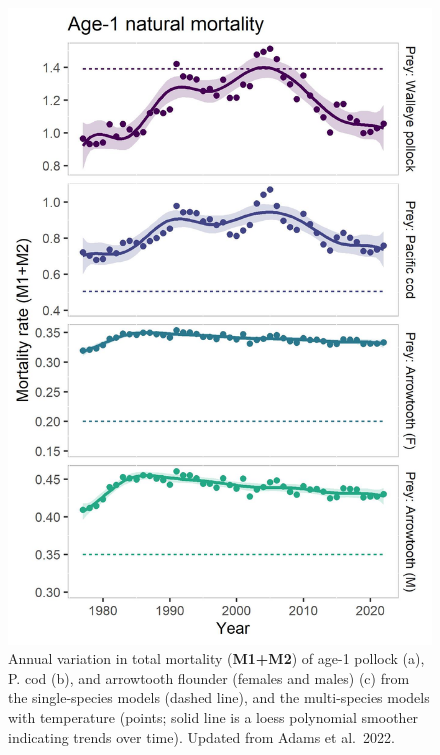 \documentclass[
]{article}
\begin{document}
\begin{figure}
\centering
\includegraphics{Results/ESR_Fig1.jpg}
\caption{Annual variation in total mortality (\textbf{M1+M2}) of age-1
pollock (a), P. cod (b), and arrowtooth flounder (females and males) (c)
from the single-species models (dashed line), and the multi-species
models with temperature (points; solid line is a loess polynomial
smoother indicating trends over time). Updated from Adams et al.~2022.}
\end{figure}
\end{document}
